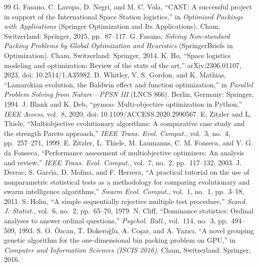 \documentclass[journal]{IEEEtran}
\begin{document}
\begin{thebibliography}{99}
 G. Fasano, C. Lavopa, D. Negri, and M. C. Vola, ``CAST: A successful project in support of the International Space Station logistics,'' in \emph{Optimized Packings with Applications} (Springer Optimization and Its Applications). Cham, Switzerland: Springer, 2015, pp.~87--117.
 G. Fasano, \emph{Solving Non-standard Packing Problems by Global Optimization and Heuristics} (SpringerBriefs in Optimization). Cham, Switzerland: Springer, 2014.
 K. Ho, ``Space logistics modeling and optimization: Review of the state of the art,'' arXiv:2306.01107, 2023, doi: 10.2514/1.A35982.
 D. Whitley, V. S. Gordon, and K. Mathias, ``Lamarckian evolution, the Baldwin effect and function optimization,'' in \emph{Parallel Problem Solving from Nature---PPSN III} (LNCS 866). Berlin, Germany: Springer, 1994.
 J. Blank and K. Deb, ``pymoo: Multi-objective optimization in Python,'' \emph{IEEE Access}, vol.~8, 2020, doi: 10.1109/ACCESS.2020.2990567.
 E. Zitzler and L. Thiele, ``Multiobjective evolutionary algorithms: A comparative case study and the strength Pareto approach,'' \emph{IEEE Trans. Evol. Comput.}, vol.~3, no.~4, pp.~257--271, 1999.
 E. Zitzler, L. Thiele, M. Laumanns, C. M. Fonseca, and V. G. da Fonseca, ``Performance assessment of multiobjective optimizers: An analysis and review,'' \emph{IEEE Trans. Evol. Comput.}, vol.~7, no.~2, pp.~117--132, 2003.
 J. Derrac, S. Garc\'{\i}a, D. Molina, and F. Herrera, ``A practical tutorial on the use of nonparametric statistical tests as a methodology for comparing evolutionary and swarm intelligence algorithms,'' \emph{Swarm Evol. Comput.}, vol.~1, no.~1, pp.~3--18, 2011.
 S. Holm, ``A simple sequentially rejective multiple test procedure,'' \emph{Scand. J. Statist.}, vol.~6, no.~2, pp.~65--70, 1979.
 N. Cliff, ``Dominance statistics: Ordinal analyses to answer ordinal questions,'' \emph{Psychol. Bull.}, vol.~114, no.~3, pp.~494--509, 1993.
 S. O. \"Ozcan, T. Dokero\u{g}lu, A. Co\c{s}ar, and A. Yaz\i c\i, ``A novel grouping genetic algorithm for the one-dimensional bin packing problem on GPU,'' in \emph{Computer and Information Sciences (ISCIS 2016)}. Cham, Switzerland: Springer, 2016.
\end{thebibliography}
\end{document}
